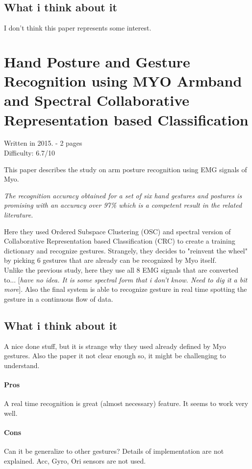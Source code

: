 \documentclass{article}
\begin{document}
\subsection{What i think about it}
I don't think this paper represents some interest. 

\section{Hand Posture and Gesture Recognition using MYO Armband and Spectral Collaborative Representation based Classification}
Written in 2015. - 2 pages\\
Difficulty: 6.7/10

This paper describes the study on arm posture recognition using EMG signals of Myo. 
\begin{center}
\textit{The recognition accuracy obtained for a
set of six hand gestures and postures is promising with an
accuracy over 97\% which is a competent result in the related
literature.}
\end{center}

Here they used Ordered Subspace Clustering (OSC) and spectral version of Collaborative Representation based Classification (CRC) to create a training dictionary and recognize gestures. Strangely, they decides to "reinvent the wheel" by picking 6 gestures that are already can be recognized by Myo itself. \\
Unlike the previous study, here they use all 8 EMG signals that are converted to... [\textit{have no idea. It is some spectral form that i don't know. Need to dig it a bit more}]. Also the final system is able to recognize gesture in real time spotting the gesture in a continuous flow of data.\\

\subsection{What i think about it}
A nice done stuff, but it is strange why they used already defined by Myo gestures. Also the paper it not clear enough so, it might be challenging to understand. 
\paragraph{Pros}
A real time recognition is great (almost necessary) feature.
It seems to work very well.
\paragraph{Cons}
Can it be generalize to other gestures?
Details of implementation are not explained.
Acc, Gyro, Ori sensors are not used.
\end{document}
